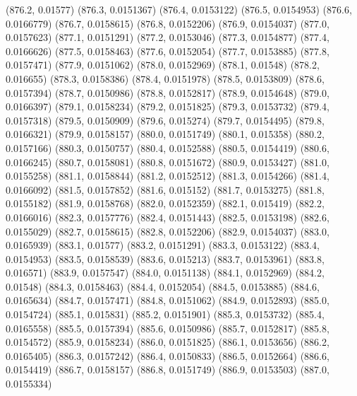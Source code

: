 {					(876.2, 0.01577)
					(876.3, 0.0151367)
					(876.4, 0.0153122)
					(876.5, 0.0154953)
					(876.6, 0.0166779)
					(876.7, 0.0158615)
					(876.8, 0.0152206)
					(876.9, 0.0154037)
					(877.0, 0.0157623)
					(877.1, 0.0151291)
					(877.2, 0.0153046)
					(877.3, 0.0154877)
					(877.4, 0.0166626)
					(877.5, 0.0158463)
					(877.6, 0.0152054)
					(877.7, 0.0153885)
					(877.8, 0.0157471)
					(877.9, 0.0151062)
					(878.0, 0.0152969)
					(878.1, 0.01548)
					(878.2, 0.016655)
					(878.3, 0.0158386)
					(878.4, 0.0151978)
					(878.5, 0.0153809)
					(878.6, 0.0157394)
					(878.7, 0.0150986)
					(878.8, 0.0152817)
					(878.9, 0.0154648)
					(879.0, 0.0166397)
					(879.1, 0.0158234)
					(879.2, 0.0151825)
					(879.3, 0.0153732)
					(879.4, 0.0157318)
					(879.5, 0.0150909)
					(879.6, 0.015274)
					(879.7, 0.0154495)
					(879.8, 0.0166321)
					(879.9, 0.0158157)
					(880.0, 0.0151749)
					(880.1, 0.015358)
					(880.2, 0.0157166)
					(880.3, 0.0150757)
					(880.4, 0.0152588)
					(880.5, 0.0154419)
					(880.6, 0.0166245)
					(880.7, 0.0158081)
					(880.8, 0.0151672)
					(880.9, 0.0153427)
					(881.0, 0.0155258)
					(881.1, 0.0158844)
					(881.2, 0.0152512)
					(881.3, 0.0154266)
					(881.4, 0.0166092)
					(881.5, 0.0157852)
					(881.6, 0.015152)
					(881.7, 0.0153275)
					(881.8, 0.0155182)
					(881.9, 0.0158768)
					(882.0, 0.0152359)
					(882.1, 0.015419)
					(882.2, 0.0166016)
					(882.3, 0.0157776)
					(882.4, 0.0151443)
					(882.5, 0.0153198)
					(882.6, 0.0155029)
					(882.7, 0.0158615)
					(882.8, 0.0152206)
					(882.9, 0.0154037)
					(883.0, 0.0165939)
					(883.1, 0.01577)
					(883.2, 0.0151291)
					(883.3, 0.0153122)
					(883.4, 0.0154953)
					(883.5, 0.0158539)
					(883.6, 0.015213)
					(883.7, 0.0153961)
					(883.8, 0.016571)
					(883.9, 0.0157547)
					(884.0, 0.0151138)
					(884.1, 0.0152969)
					(884.2, 0.01548)
					(884.3, 0.0158463)
					(884.4, 0.0152054)
					(884.5, 0.0153885)
					(884.6, 0.0165634)
					(884.7, 0.0157471)
					(884.8, 0.0151062)
					(884.9, 0.0152893)
					(885.0, 0.0154724)
					(885.1, 0.015831)
					(885.2, 0.0151901)
					(885.3, 0.0153732)
					(885.4, 0.0165558)
					(885.5, 0.0157394)
					(885.6, 0.0150986)
					(885.7, 0.0152817)
					(885.8, 0.0154572)
					(885.9, 0.0158234)
					(886.0, 0.0151825)
					(886.1, 0.0153656)
					(886.2, 0.0165405)
					(886.3, 0.0157242)
					(886.4, 0.0150833)
					(886.5, 0.0152664)
					(886.6, 0.0154419)
					(886.7, 0.0158157)
					(886.8, 0.0151749)
					(886.9, 0.0153503)
					(887.0, 0.0155334)
}
